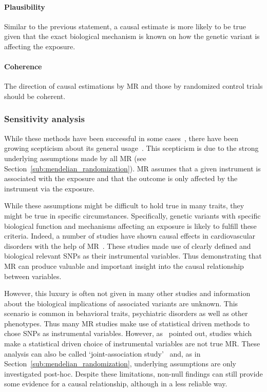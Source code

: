 \paragraph{Plausibility}
\label{par:plausibility}
Similar to the previous statement, a causal estimate is more likely to be true given that the exact biological mechanism is known on how the genetic variant is affecting the exposure.

\paragraph{Coherence}
\label{par:coherence}
The direction of causal estimations by MR and those by randomized control trials should be coherent.






\subsubsection{Sensitivity analysis}
\label{ssub:sensitivity_analysis}

While these methods have been successful in some cases~\cite{Swerdlow}, there have been growing scepticism about its general usage~\cite{Thomas2010,Hemani2016,Brion2014,Voight2014,Burgess2016,Burgess2016a}. 
This scepticism is due to the strong underlying assumptions made by all MR (see Section~\ref{sub:mendelian_randomization}).
MR assumes that a given instrument is associated with the exposure and that the outcome is only affected by the instrument via the exposure.

While these assumptions might be difficult to hold true in many traits, they might be true in specific circumstances.
Specifically, genetic variants with specific biological function and mechanisms affecting an exposure is likely to fulfill these criteria.
Indeed, a number of studies have shown causal effects in cardiovascular disorders with the help of MR~\cite{Swerdlow,Ference2015,Lieb2013,Voight2012a}.
These studies made use of clearly defined and biological relevant SNPs as their instrumental variables.
Thus demonstrating that MR can produce valuable and important insight into the causal relationship between variables.

However, this luxury is often not given in many other studies and information about the biological implications of associated variants are unknown.
This scenario is common in behavioral traits, psychiatric disorders as well as other phenotypes.
Thus many MR studies make use of statistical driven methods to chose SNPs as instrumental variables.
However, as~\citet{Burgess2016a} pointed out, studies which make a statistical driven choice of instrumental variables are not true MR\@.
These analysis can also be called `joint-association study'~\citet{Burgess2016a} and, as in Section~\ref{sub:mendelian_randomization}, underlying assumptions are only investigated post-hoc.
Despite these limitations, non-null findings can still provide some evidence for a causal relationship, although in a less reliable way.

